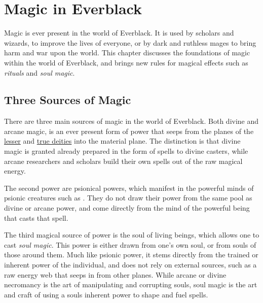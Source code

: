 \chapter{Magic in Everblack}
\label{sec:Magic}

Magic is ever present in the world of Everblack. It is used by scholars and
wizards, to improve the lives of everyone, or by dark and ruthless mages to
bring harm and war upon the world. This chapter discusses the foundations of
magic within the world of Everblack, and brings new rules for magical effects
such as \emph{rituals} and \emph{soul magic}.

\section{Three Sources of Magic}

There are three main sources of magic in the world of Everblack. Both divine
and arcane magic, is an ever present form of power that seeps from the planes
of the \hyperref[sec:Lesser Deities]{lesser} and \hyperref[sec:True
  Deities]{true deities} into the material plane. The distinction is that
divine magic is granted already prepared in the form of spells to divine
casters, while arcane researchers and scholars build their own spells out of
the raw magical energy.

The second power are psionical powers, which manifest in the powerful minds of
psionic creatures such as . They do not draw their power
from the same pool as divine or arcane power, and come directly from the mind
of the powerful being that casts that spell.

The third magical source of power is the soul of living beings, which allows
one to cast \emph{soul magic}. This power is either drawn from one's own soul,
or from souls of those around them. Much like psionic power, it stems directly
from the trained or inherent power of the individual, and does not rely on
external sources, such as a raw energy web that seeps in from other planes.
While arcane or divine necromancy is the art of manipulating and corrupting
souls, soul magic is the art and craft of using a souls inherent power to
shape and fuel spells.




